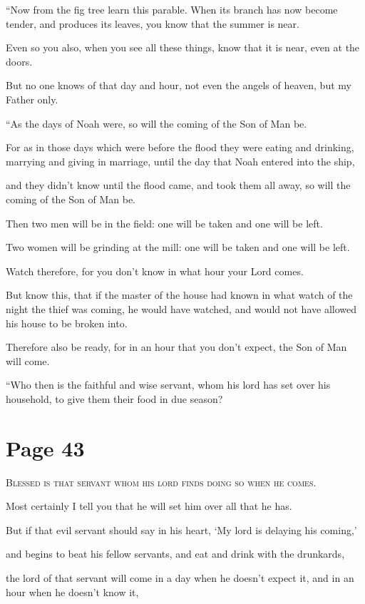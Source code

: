 “Now from the fig tree learn this parable. When its branch has now become tender, and produces its leaves, you know that the summer is near.

Even so you also, when you see all these things, know that it is near, even at the doors.

But no one knows of that day and hour, not even the angels of heaven, but my Father only.

“As the days of Noah were, so will the coming of the Son of Man be.

For as in those days which were before the flood they were eating and drinking, marrying and giving in marriage, until the day that Noah entered into the ship,

and they didn’t know until the flood came, and took them all away, so will the coming of the Son of Man be.

Then two men will be in the field: one will be taken and one will be left.

Two women will be grinding at the mill: one will be taken and one will be left.

Watch therefore, for you don’t know in what hour your Lord comes.

But know this, that if the master of the house had known in what watch of the night the thief was coming, he would have watched, and would not have allowed his house to be broken into.

Therefore also be ready, for in an hour that you don’t expect, the Son of Man will come.

“Who then is the faithful and wise servant, whom his lord has set over his household, to give them their food in due season?



\chapterornament
\section*{Page 43}

\lettrine{B}{lessed is that servant whom his lord finds doing so when he comes.}

Most certainly I tell you that he will set him over all that he has.

But if that evil servant should say in his heart, ‘My lord is delaying his coming,’

and begins to beat his fellow servants, and eat and drink with the drunkards,

the lord of that servant will come in a day when he doesn’t expect it, and in an hour when he doesn’t know it,

